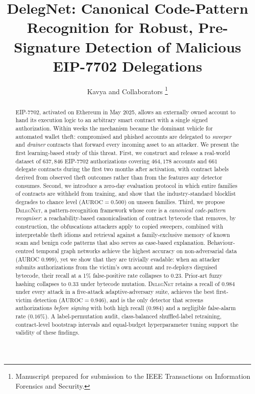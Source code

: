 \documentclass[journal]{IEEEtran}
\newcommand{\dn}{\textsc{DelegNet}}
\begin{document}
\title{DelegNet: Canonical Code-Pattern Recognition for Robust, Pre-Signature Detection of Malicious EIP-7702 Delegations}

\author{Kavya and Collaborators%
\thanks{Manuscript prepared for submission to the IEEE Transactions on Information Forensics and Security.}}


\maketitle

\begin{abstract}
EIP-7702, activated on Ethereum in May 2025, allows an externally owned account to hand its execution logic to an arbitrary smart contract with a single signed authorization. Within weeks the mechanism became the dominant vehicle for automated wallet theft: compromised and phished accounts are delegated to \emph{sweeper} and \emph{drainer} contracts that forward every incoming asset to an attacker. We present the first learning-based study of this threat. First, we construct and release a real-world dataset of $637{,}846$ EIP-7702 authorizations covering $464{,}178$ accounts and $661$ delegate contracts during the first two months after activation, with contract labels derived from observed theft outcomes rather than from the features any detector consumes. Second, we introduce a zero-day evaluation protocol in which entire families of contracts are withheld from training, and show that the industry-standard blocklist degrades to chance level ($\mathrm{AUROC}=0.500$) on unseen families. Third, we propose \dn{}, a pattern-recognition framework whose core is a \emph{canonical code-pattern recogniser}: a reachability-based canonicalisation of contract bytecode that removes, by construction, the obfuscations attackers apply to copied sweepers, combined with interpretable theft idioms and retrieval against a family-exclusive memory of known scam and benign code patterns that also serves as case-based explanation. Behaviour-centred temporal graph networks achieve the highest accuracy on non-adversarial data (AUROC $0.999$), yet we show that they are trivially evadable: when an attacker submits authorizations from the victim's own account and re-deploys disguised bytecode, their recall at a 1\% false-positive rate collapses to $0.23$. Prior-art fuzzy hashing collapses to $0.33$ under bytecode mutation. \dn{} retains a recall of $0.984$ under every attack in a five-attack adaptive-adversary suite, achieves the best first-victim detection ($\mathrm{AUROC}=0.946$), and is the only detector that screens authorizations \emph{before signing} with both high recall ($0.984$) and a negligible false-alarm rate ($0.16\%$). A label-permutation audit, class-balanced shuffled-label retraining, contract-level bootstrap intervals and equal-budget hyperparameter tuning support the validity of these findings.
\end{abstract}
\end{document}
